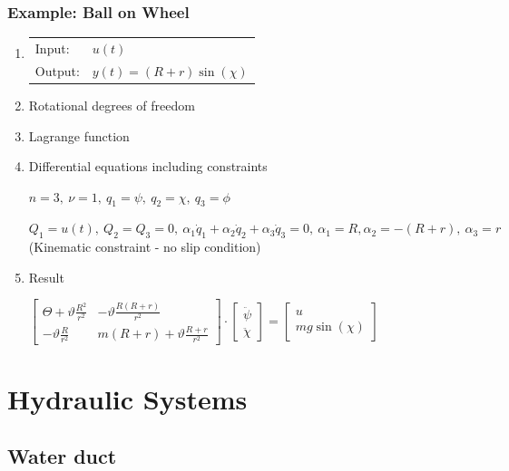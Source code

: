 \documentclass[10pt,a4paper]{scrartcl}
\begin{document}
\begin{multicols*}{3}
\subsubsection{Example: Ball on Wheel}


\begin{enumerate}
\item \begin{tabular}{ll}Input:&$u(t)$\\Output: &$y(t)=(R+r)\sin(\chi)$\end{tabular}

\item Rotational degrees of freedom
\item Lagrange function
\item Differential equations including constraints

$n=3,\ \nu=1,\ q_1=\psi,\ q_2=\chi,\ q_3=\phi$


$Q_1=u(t),\ Q_2=Q_3=0,\ \alpha_1\dot{q}_1+\alpha_2\dot{q}_2+\alpha_3\dot{q}_3=0,\ \alpha_1=R,\alpha_2=-(R+r),\ \alpha_3=r$ (Kinematic constraint - no slip condition)

\item Result

$\begin{bmatrix} \Theta+\vartheta \frac{R^2}{r^2}&-\vartheta\frac{R(R+r)}{r^2}\\-\vartheta\frac{R}{r^2}&m(R+r)+\vartheta\frac{R+r}{r^2}\end{bmatrix}\cdot\begin{bmatrix}\ddot{\psi}\\\ddot{\chi}\end{bmatrix}=\begin{bmatrix}u\\mg\sin(\chi)\end{bmatrix}$

\end{enumerate}

\vfill
\null
\columnbreak

\section{Hydraulic Systems}

\subsection{Water duct}


\end{multicols*}
\end{document}
